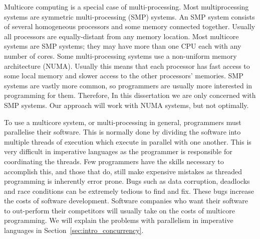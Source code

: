 
Multicore computing is a special case of multi-processing.
Most multiprocessing systems are symmetric multi-processing (SMP) systems.
An SMP system consists of several homogeneous processors and some memory
connected together.
Usually all processors are equally-distant from any memory location.
Most multicore systems are SMP systems;
they may have more than one CPU each with any number of cores.
Some multi-processing systems use a non-uniform memory architecture (NUMA).
Usually this means that each processor has fast access to some local memory
and slower access to the other processors' memories.
SMP systems are vastly more common, so programmers are usually more
interested in programming for them.
Therefore, In this dissertation we are only concerned with SMP systems.
Our approach will work with NUMA systems, but not optimally.


To use a multicore system, or multi-processing in general,
programmers must parallelise their software.
This is normally done by dividing the software into multiple threads of
execution
which execute in parallel with one another.
This is very difficult in imperative languages as the programmer is
responsible for coordinating the threads.
Few programmers have the skills necessary to accomplish this,
and those that do, still make expensive mistakes as
threaded programming is inherently error prone. 
Bugs such as data corruption, deadlocks and race conditions
can be extremely tedious to find and fix.
These bugs increase the costs of software development.
Software companies who want their software to out-perform their competitors
will usually take on the costs of multicore programming.
We will explain the problems with parallelism in imperative languages in
Section~\ref{sec:intro_concurrency}.

